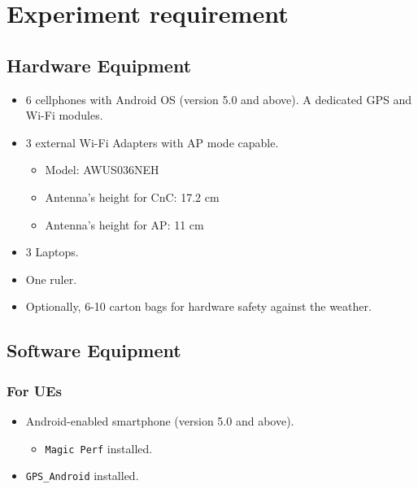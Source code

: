 \hypertarget{experiment-requirement}{%
\section{Experiment requirement}\label{experiment-requirement}}

\hypertarget{hardware-equipment}{%
\subsection{Hardware Equipment}\label{hardware-equipment}}

\begin{itemize}
\tightlist
\item
  6 cellphones with Android OS (version 5.0 and above). A dedicated GPS
  and Wi-Fi modules.
\item
  3 external Wi-Fi Adapters with AP mode capable.

  \begin{itemize}
  \tightlist
  \item
    Model: AWUS036NEH
  \item
    Antenna's height for CnC: 17.2 cm
  \item
    Antenna's height for AP: 11 cm
  \end{itemize}
\item
  3 Laptops.
\item
  One ruler.
\item
  Optionally, 6-10 carton bags for hardware safety against the weather.
\end{itemize}

\hypertarget{software-equipment}{%
\subsection{Software Equipment}\label{software-equipment}}

\hypertarget{for-ues}{%
\subsubsection{For UEs}\label{for-ues}}

\begin{itemize}
\tightlist
\item
  Android-enabled smartphone (version 5.0 and above).

  \begin{itemize}
  \tightlist
  \item
    \texttt{Magic\ Perf} installed.
  \end{itemize}
\item
  \texttt{GPS\_Android} installed.
\end{itemize}

